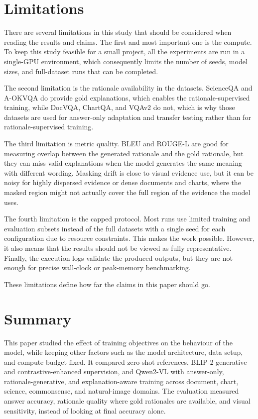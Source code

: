 \documentclass[12pt,bibliography=totoc,listof=totoc,BCOR=5mm,DIV=12,oneside,open=any]{scrbook}
\begin{document}
\section{Limitations}
There are several limitations in this study that should be considered when reading the results and claims.
The first and most important one is the compute.
To keep this study feasible for a small project, all the experiments are run in a single-GPU environment, which consequently limits the number of seeds, model sizes, and full-dataset runs that can be completed.

The second limitation is the rationale availability in the datasets.
ScienceQA and A-OKVQA do provide gold explanations, which enables the rationale-supervised training, while DocVQA, ChartQA, and VQAv2 do not, which is why those datasets are used for answer-only adaptation and transfer testing rather than for rationale-supervised training.

The third limitation is metric quality.
BLEU and ROUGE-L are good for measuring overlap between the generated rationale and the gold rationale, but they can miss valid explanations when the model generates the same meaning with different wording.
Masking drift is close to visual evidence use, but it can be noisy for highly dispersed evidence or dense documents and charts, where the masked region might not actually cover the full region of the evidence the model uses.

The fourth limitation is the capped protocol.
Most runs use limited training and evaluation subsets instead of the full datasets with a single seed for each configuration due to resource constraints.
This makes the work possible. However, it also means that the results should not be viewed as fully representative.
Finally, the execution logs validate the produced outputs, but they are not enough for precise wall-clock or peak-memory benchmarking.

These limitations define how far the claims in this paper should go.

\section{Summary}
This paper studied the effect of training objectives on the behaviour of the model, while keeping other factors such as the model architecture, data setup, and compute budget fixed.
It compared zero-shot references, BLIP-2 generative and contrastive-enhanced supervision, and Qwen2-VL with answer-only, rationale-generative, and explanation-aware training across document, chart, science, commonsense, and natural-image domains.
The evaluation measured answer accuracy, rationale quality where gold rationales are available, and visual sensitivity, instead of looking at final accuracy alone.
\end{document}
